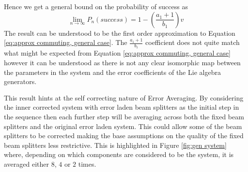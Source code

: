 \documentclass[aps,pra,twocolumn,superscriptaddress,numerical,floatfix]{revtex4-1}
\begin{document}
Hence we get a general bound on the probability of success as
\begin{equation}
\lim_{n\rightarrow\infty}P_{n}\left(success\right)=1-\left(\frac{a_{1}+1}{b_{1}}\right)v\label{eq:PsuccessGeneral}
\end{equation}
The result can be understood to be the first order approximation to Equation \ref{eq:approx commuting, general case}. The $\frac{a_1+1}{b_1}$ coefficient does not quite match what might be expected from Equation \ref{eq:approx commuting, general case} however it can be understood as there is not any clear isomorphic map between the parameters in the system and the error coefficients of the Lie algebra generators.

This result hints at the self correcting nature of Error Averaging. By considering the inner corrected system with error laden beam splitters as the initial step in the sequence then each further step will be averaging across both the fixed beam splitters and the original error laden system. This could allow some of the beam splitters to be corrected  making the base assumptions on the quality of the fixed beam splitters less restrictive. This is highlighted in Figure \ref{fig:gen system} where, depending on which components are considered to be the system, it is averaged either $8$, $4$ or $2$ times. 
\end{document}
